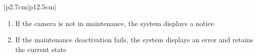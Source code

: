 \begin{table}[H]
\begin{tabular}{|p{2.7cm}|p{12.5cm}|}
\begin{minipage}[t]{\linewidth}
                                      \begin{enumerate}[topsep=0pt,itemsep=1pt,parsep=0pt,partopsep=0pt]
                                          \item If the camera is not in maintenance, the system displays a notice
                                          \item If the maintenance deactivation fails, the system displays an error and retains
                                                the current state
                                      \end{enumerate}
                                  \end{minipage}           \\
        \hline
    \end{tabular}
    \label{tab:admin-disable-camera-maintenance}
\end{table}



